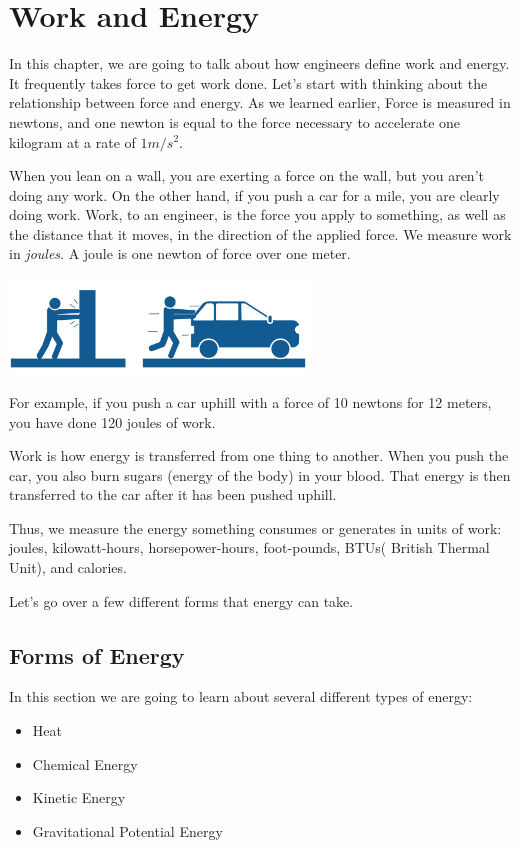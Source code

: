 \chapter{Work and Energy}

In this chapter, we are going to talk about how engineers define work
and energy. It frequently takes force to get work done. Let's start with thinking about the relationship between force and energy. As we learned earlier, Force is measured in
newtons, and one newton is equal to the force necessary to accelerate one
kilogram at a rate of $1 m/s^2$.

When you lean on a wall, you are exerting a force on the wall, but you
aren't doing any work. On the other hand, if you push a car for a mile,
you are clearly doing work. Work, to an engineer, is the force you
apply to something, as well as the distance that it moves, in the direction
of the applied force. We measure work in \textit{joules}. A joule is one
newton of force over one meter.

\includegraphics[width=0.6\textwidth]{workvsforce.png}

For example, if you push a car uphill with a force of 10 newtons for 12
meters, you have done 120 joules of work.

Work is how energy is transferred from one thing to another. When you
push the car, you also burn sugars (energy of the body) in your blood. That energy is then
transferred to the car after it has been pushed uphill.

Thus, we measure the energy something consumes or generates in
units of work: joules, kilowatt-hours, horsepower-hours, foot-pounds,
BTUs( British Thermal Unit), and calories.

Let's go over a few different forms that energy can take.

\section{Forms of Energy}

In this section we are going to learn about several different types of energy:
\begin{itemize}
\item Heat
\item Chemical Energy
\item Kinetic Energy
\item Gravitational Potential Energy
\end{itemize}


